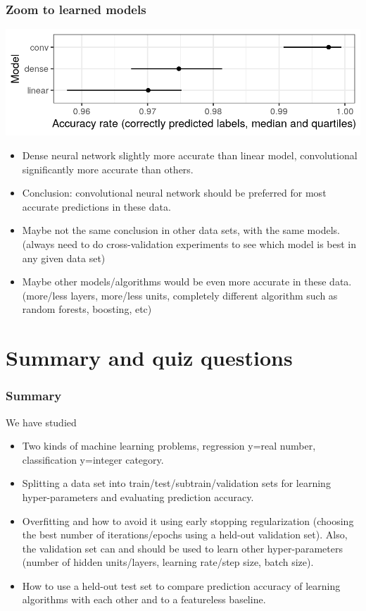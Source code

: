 \documentclass{beamer}
\begin{document}
\begin{frame}
  \frametitle{Zoom to learned models}
  \includegraphics[width=\textwidth]{figure-test-accuracy}
  \begin{itemize}
  \item Dense neural network slightly more accurate
    than linear model, convolutional significantly more
    accurate than others.
  \item Conclusion: convolutional neural network should be preferred
    for most accurate predictions in these data.
  \item Maybe not the same conclusion in other data sets, with the
    same models. (always need to do cross-validation experiments to
    see which model is best in any given data set)
  \item Maybe other models/algorithms would be even more accurate in
    these data. (more/less layers, more/less units, completely
    different algorithm such as random forests, boosting, etc)
  \end{itemize}
\end{frame}

\section{Summary and quiz questions}

\begin{frame}
  \frametitle{Summary}
We have studied
  \begin{itemize}
  \item Two kinds of machine learning problems, regression y=real number,
    classification y=integer category.
  \item Splitting a data set into train/test/subtrain/validation sets
    for learning hyper-parameters and evaluating prediction accuracy.
  \item Overfitting and how to avoid it using early stopping
    regularization (choosing the best number of iterations/epochs
    using a held-out validation set). Also, the validation set can and
    should be used to learn other hyper-parameters (number of hidden
    units/layers, learning rate/step size, batch size).
  \item How to use a held-out test set to compare prediction accuracy
    of learning algorithms with each other and to a featureless
    baseline.
  \end{itemize}
\end{frame}
\end{document}
